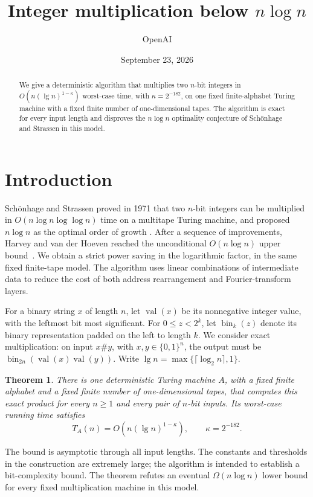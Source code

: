 \documentclass[11pt]{article}
\title{Integer multiplication below \texorpdfstring{$n\log n$}{n log n}}
\author{OpenAI}
\date{September 23, 2026}
\newtheorem{theorem}{Theorem}
\theoremstyle{definition}
\begin{document}
\maketitle
\begin{abstract}
We give a deterministic algorithm that multiplies two $n$-bit integers
in $O(n(\lg n)^{1-\kappa})$ worst-case time, with
$\kappa=2^{-182}$, on one fixed finite-alphabet Turing machine with a
fixed finite number of one-dimensional tapes. The algorithm is exact
for every input length and disproves the $n\log n$ optimality conjecture
of Sch\"onhage and Strassen in this model.
\end{abstract}
\tableofcontents
\clearpage
\section{Introduction}

Sch\"onhage and Strassen proved in 1971 that two $n$-bit integers can
be multiplied in $O(n\log n\log\log n)$ time on a multitape Turing
machine, and proposed $n\log n$ as the optimal order of growth
\cite[Section~1]{SchonhageStrassen1971}. After a sequence of improvements,
Harvey and van der Hoeven reached the unconditional $O(n\log n)$ upper
bound~\cite{HarveyHoeven2021}. We obtain a strict power saving in the
logarithmic factor, in the same fixed finite-tape model. The algorithm
uses linear combinations of intermediate data to reduce the cost of
both address rearrangement and Fourier-transform layers.

For a binary string $x$ of length $n$, let $\operatorname{val}(x)$ be
its nonnegative integer value, with the leftmost bit most significant.
For $0\le z<2^k$, let $\operatorname{bin}_k(z)$ denote its binary
representation padded on the left to length $k$. We consider exact
multiplication: on input $x\#y$, with $x,y\in\{0,1\}^n$, the output
must be $\operatorname{bin}_{2n}(\operatorname{val}(x)\operatorname{val}(y))$.
Write $\lg n=\max\{\lceil\log_2 n\rceil,1\}$.

\begin{theorem}\label{thm:main}
There is one deterministic Turing machine $A$, with a fixed finite
alphabet and a fixed finite number of one-dimensional tapes, that
computes this exact product for every $n\ge1$ and every pair of $n$-bit
inputs. Its worst-case running time satisfies
\[
 T_A(n)=O\!\left(n(\lg n)^{1-\kappa}\right),
 \qquad \kappa=2^{-182}.
\]
\end{theorem}

The bound is asymptotic through all input lengths. The constants and
thresholds in the construction are extremely large; the algorithm is
intended to establish a bit-complexity bound. The theorem refutes an
eventual $\Omega(n\log n)$ lower bound for every fixed multiplication
machine in this model.
\end{document}
